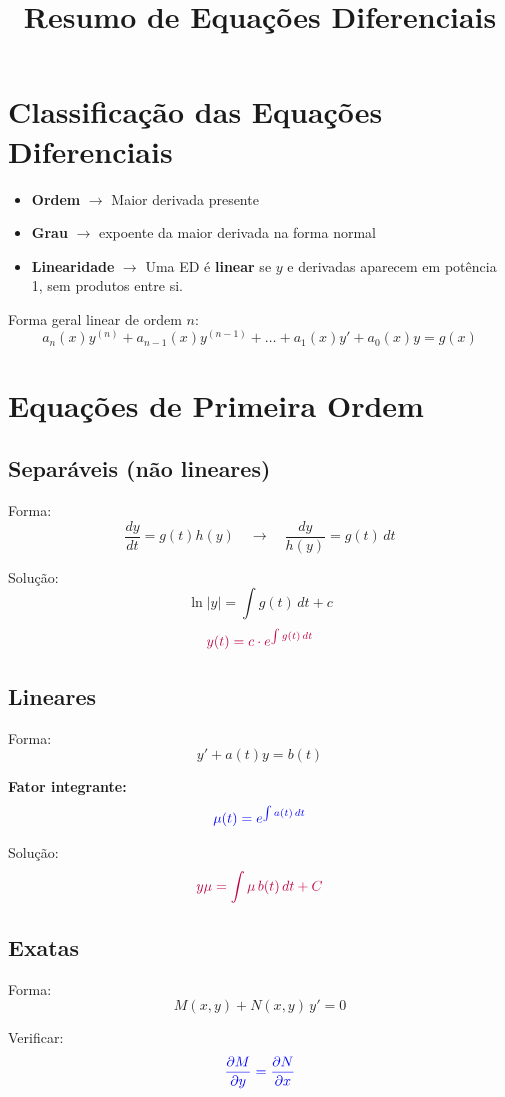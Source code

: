 \documentclass[a4paper,12pt]{article}
\title{Resumo de Equações Diferenciais}
\author{}
\date{}
\begin{document}
\maketitle

\section*{Classificação das Equações Diferenciais}
\begin{itemize}
    \item \textbf{Ordem} $\to$ Maior derivada presente
    \item \textbf{Grau} $\to$ expoente da maior derivada na forma normal
    \item \textbf{Linearidade} $\to$ Uma ED é \textbf{linear} se $y$ e derivadas aparecem em potência 1, sem produtos entre si.
\end{itemize}

Forma geral linear de ordem $n$:
\[
a_n(x)y^{(n)}+a_{n-1}(x)y^{(n-1)}+\dots+a_1(x)y'+a_0(x)y=g(x)
\]

\section*{Equações de Primeira Ordem}

\subsection*{Separáveis (não lineares)}
Forma:
\[
\frac{dy}{dt}=g(t)h(y) \quad \to \quad \frac{dy}{h(y)}=g(t)\,dt
\]

Solução:
\[
\ln|y|= \int g(t)\,dt + c
\]
\[
\textcolor{purple}{y(t)=c\cdot e^{\int g(t)\,dt}}
\]

\subsection*{Lineares}
Forma:
\[
y'+a(t)y=b(t)
\]

\textbf{Fator integrante:}
\[
\textcolor{blue}{\mu(t)=e^{\int a(t)\,dt}}
\]

Solução:
\[
\textcolor{purple}{y\mu=\int \mu\, b(t)\,dt + C}
\]

\subsection*{Exatas}
Forma:
\[
M(x,y)+N(x,y)\,y'=0
\]

Verificar:
\[
\textcolor{blue}{\frac{\partial M}{\partial y}=\frac{\partial N}{\partial x}}
\]
\end{document}
